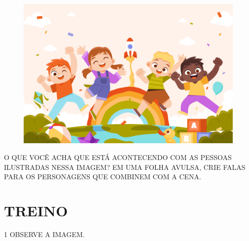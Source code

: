 \begin{figure}[H]
\centering
\includegraphics[width=.8\textwidth]{media/image174.jpg}
\end{figure}

O QUE VOCÊ ACHA QUE ESTÁ ACONTECENDO COM AS PESSOAS ILUSTRADAS NESSA IMAGEM? EM UMA FOLHA AVULSA, CRIE FALAS PARA OS PERSONAGENS QUE COMBINEM COM A CENA.


\section*{TREINO}


\num{1} OBSERVE A IMAGEM.

